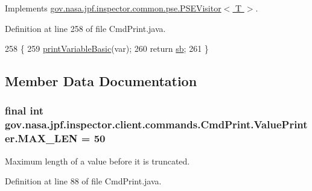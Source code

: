 Implements \hyperlink{interfacegov_1_1nasa_1_1jpf_1_1inspector_1_1common_1_1pse_1_1_p_s_e_visitor_a8ca998a9c9ea31dd1b31f45db5b77d45}{gov.\+nasa.\+jpf.\+inspector.\+common.\+pse.\+P\+S\+E\+Visitor$<$ T $>$}.



Definition at line 258 of file Cmd\+Print.\+java.


\begin{DoxyCode}
258                                                                               \{
259       \hyperlink{classgov_1_1nasa_1_1jpf_1_1inspector_1_1client_1_1commands_1_1_cmd_print_1_1_value_printer_aed27bc0c67ac2933c4b57723560e8e3d}{printVariableBasic}(var);
260       \textcolor{keywordflow}{return} \hyperlink{classgov_1_1nasa_1_1jpf_1_1inspector_1_1client_1_1commands_1_1_cmd_print_1_1_value_printer_a86eacdeab16acd6491038a0d80c57f62}{sb};
261     \}
\end{DoxyCode}


\subsection{Member Data Documentation}
\subsubsection[{\texorpdfstring{M\+A\+X\+\_\+\+L\+EN}{MAX_LEN}}]{\setlength{\rightskip}{0pt plus 5cm}final int gov.\+nasa.\+jpf.\+inspector.\+client.\+commands.\+Cmd\+Print.\+Value\+Printer.\+M\+A\+X\+\_\+\+L\+EN = 50\hspace{0.3cm}{\ttfamily [static]}}\hypertarget{classgov_1_1nasa_1_1jpf_1_1inspector_1_1client_1_1commands_1_1_cmd_print_1_1_value_printer_a89fe8bec98f986921e7e08f191ff9179}{}\label{classgov_1_1nasa_1_1jpf_1_1inspector_1_1client_1_1commands_1_1_cmd_print_1_1_value_printer_a89fe8bec98f986921e7e08f191ff9179}


Maximum length of a value before it is truncated. 



Definition at line 88 of file Cmd\+Print.\+java.

